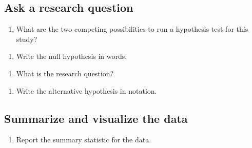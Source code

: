 \documentclass[
]{report}
\providecommand{\tightlist}{%
  \setlength{\itemsep}{0pt}\setlength{\parskip}{0pt}}
\begin{document}
\vspace{0.3in}

\hypertarget{ask-a-research-question}{%
\subsection*{Ask a research question}\label{ask-a-research-question}}

\begin{enumerate}
\def\labelenumi{\arabic{enumi}.}
\setcounter{enumi}{4}
\tightlist
\item
  What are the two competing possibilities to run a hypothesis test for this study?
\end{enumerate}

\vspace{1in}

\begin{enumerate}
\def\labelenumi{\arabic{enumi}.}
\setcounter{enumi}{5}
\tightlist
\item
  Write the null hypothesis in words.
\end{enumerate}

\vspace{1in}

\begin{enumerate}
\def\labelenumi{\arabic{enumi}.}
\setcounter{enumi}{6}
\tightlist
\item
  What is the research question?
\end{enumerate}

\vspace{1in}

\begin{enumerate}
\def\labelenumi{\arabic{enumi}.}
\setcounter{enumi}{7}
\tightlist
\item
  Write the alternative hypothesis in notation.
\end{enumerate}

\vspace{1in}

\newpage

\hypertarget{summarize-and-visualize-the-data}{%
\subsection*{Summarize and visualize the data}\label{summarize-and-visualize-the-data}}

\begin{enumerate}
\def\labelenumi{\arabic{enumi}.}
\setcounter{enumi}{8}
\tightlist
\item
  Report the summary statistic for the data.
\end{enumerate}
\end{document}
